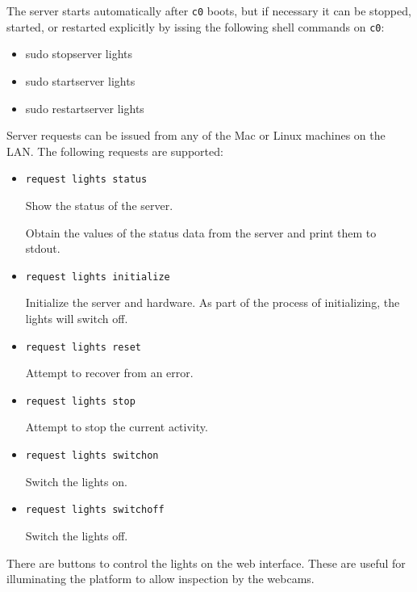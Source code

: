 The server starts automatically after \verb|c0| boots, but if necessary it can be stopped, started, or restarted explicitly by issing the following shell commands on \verb|c0|:

\begin{itemize}
\item sudo stopserver lights
\item sudo startserver lights
\item sudo restartserver lights
\end{itemize}

Server requests can be issued from any of the Mac or Linux machines on the LAN. The following requests are supported:

\begin{itemize}
\item 
\verb|request lights status|

Show the status of the server.

Obtain the values of the status data from the server and print them to stdout.
\item 
\verb|request lights initialize|

Initialize the server and hardware. As part of the process of initializing, the lights will switch off.

\item 
\verb|request lights reset|

Attempt to recover from an error.

\item 
\verb|request lights stop|

Attempt to stop the current activity.

\item 
\verb|request lights switchon|

Switch the lights on.

\item 
\verb|request lights switchoff|

Switch the lights off.

\end{itemize}

There are buttons to control the lights on the web interface. These are useful for illuminating the platform to allow inspection by the webcams.
